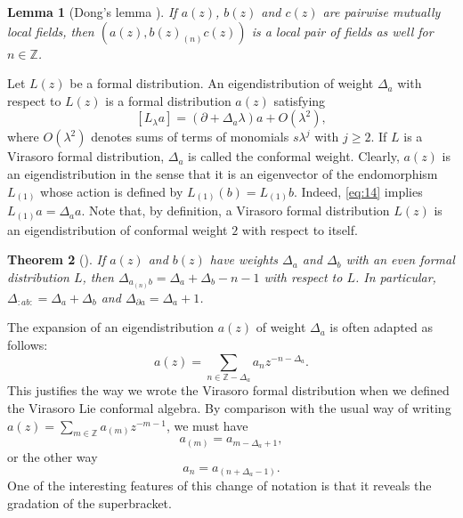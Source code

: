 \documentclass[a4paper, 12pt, reqno]{amsart}
\newtheorem{theorem}{Theorem}[subsection]
\newtheorem{lemma}[theorem]{Lemma}
\theoremstyle{remark}
\numberwithin{equation}{subsection}
\begin{document}
\begin{lemma}[Dong's lemma {\cite[LEMMA 3.2]{kac_vertex_1998}}]
  \label{lmm:2}
  If $a(z)$, $b(z)$ and $c(z)$ are pairwise mutually local fields, then $(a(z),b(z)_{(n)}c(z))$ is a local pair of fields as well for $n\in \mathbb{Z}$.
\end{lemma}

Let $L(z)$ be a formal distribution.
An eigendistribution of weight $\Delta_a$ with respect to $L(z)$ is a formal distribution $a(z)$ satisfying
\begin{equation}
  \label{eq:14}
  [L_{\lambda}a] = (\partial + \Delta_a\lambda)a + O(\lambda^2),
\end{equation}
where $O(\lambda^2)$ denotes sums of terms of monomials $s\lambda^j$ with $j \ge 2$.
If $L$ is a Virasoro formal distribution, $\Delta_a$ is called the conformal weight.
Clearly, $a(z)$ is an eigendistribution in the sense that it is an eigenvector of the endomorphism $L_{(1)}$ whose action is defined by $L_{(1)}(b) = L_{(1)}b$.
Indeed, \eqref{eq:14} implies $L_{(1)}a = \Delta_aa$.
Note that, by definition, a Virasoro formal distribution $L(z)$ is an eigendistribution of conformal weight $2$ with respect to itself.

\begin{theorem}[{\cite[Proposition 3.7.4]{nozaradan_introduction_2008}}]
  \label{thr:9}
  If $a(z)$ and $b(z)$ have weights $\Delta_a$ and $\Delta_b$ with an even formal distribution $L$, then $\Delta_{a_{(n)}b} = \Delta_a + \Delta_b - n - 1$ with respect to $L$.
  In particular, $\Delta_{:ab:} = \Delta_a + \Delta_b$ and $\Delta_{\partial a} = \Delta_a + 1$.
\end{theorem}

The expansion of an eigendistribution $a(z)$ of weight $\Delta_a$ is often adapted as follows:
\begin{equation*}
  a(z) = \sum_{n \in \mathbb{Z} - \Delta_a}a_nz^{-n - \Delta_a}.
\end{equation*}
This justifies the way we wrote the Virasoro formal distribution when we defined the Virasoro Lie conformal algebra.
By comparison with the usual way of writing $a(z) = \sum_{m \in \mathbb{Z}}a_{(m)}z^{-m - 1}$, we must have
\begin{equation*}
  a_{(m)} = a_{m - \Delta_a + 1},
\end{equation*}
or the other way
\begin{equation*}
  a_n = a_{(n + \Delta_a - 1)}.
\end{equation*}
One of the interesting features of this change of notation is that it reveals the gradation of the superbracket.
\end{document}
